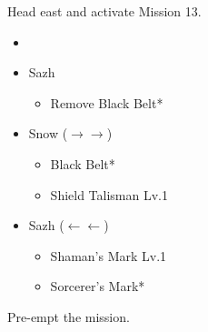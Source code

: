 Head east and activate Mission 13.

\begin{menu}
	\begin{itemize}
		\paradigm
		\begin{itemize}
			\item {}%
				  {\paradigmline{\syn}{(\sab)}{\com}}%
			      {\paradigmline{\rav}{(\sab)}{(\sen)}}%
			      {\paradigmline[4]{\syn}{\med}{(\sen)}}%
			      {\paradigmline{(\com)}{(\med)}{(\sen)}}%
			      {\paradigmline{\com}{\rav}{\com}}%
			      {\paradigmline{(\com)}{(\sab)}{(\sen)}}
		\end{itemize}
		\equip
		\begin{itemize}
			\item Sazh
				\begin{itemize}
					\item Remove Black Belt*
				\end{itemize}
			\item Snow ($\rightarrow\rightarrow$)
			      \begin{itemize}
				      \item Black Belt*
				      \item Shield Talisman Lv.1
			      \end{itemize}
			\item Sazh ($\leftarrow\leftarrow$)
			      \begin{itemize}
				      \item Shaman's Mark Lv.1
				      \item Sorcerer's Mark*
			      \end{itemize}
		\end{itemize}
	\end{itemize}
\end{menu}

\renewcommand{\first}{[1] Bully (\syn/\sab/\com)}
\renewcommand{\second}{[2] Matador (\rav/\sab/\sen)}
\renewcommand{\third}{[3] Protection (\syn/\med/\sen)}
\renewcommand{\fourth}{[4] Solidarity (\com/\med/\sen)}
\renewcommand{\sixth}{[6] Dirty Fighting (\com/\sab/\sen)}

Pre-empt the mission.

